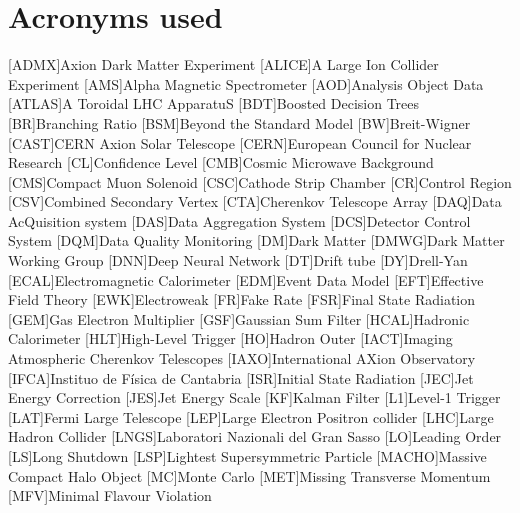 \documentclass[a4paper, 10pt, openright]{report}
\begin{document}
\chapter*{Acronyms used}
\begin{multicols}{2}
\begin{acronym}

[ADMX]{Axion Dark Matter Experiment}
[ALICE]{A Large Ion Collider Experiment}
[AMS]{Alpha Magnetic Spectrometer}
[AOD]{Analysis Object Data}
[ATLAS]{A Toroidal LHC ApparatuS}
[BDT]{Boosted Decision Trees}
[BR]{Branching Ratio}
[BSM]{Beyond the Standard Model}
[BW]{Breit-Wigner}
[CAST]{CERN Axion Solar Telescope}
[CERN]{European Council for Nuclear Research}
[CL]{Confidence Level}
[CMB]{Cosmic Microwave Background}
[CMS]{Compact Muon Solenoid}
[CSC]{Cathode Strip Chamber}
[CR]{Control Region}
[CSV]{Combined Secondary Vertex}
[CTA]{Cherenkov Telescope Array}
[DAQ]{Data AcQuisition system}
[DAS]{Data Aggregation System}
[DCS]{Detector Control System}
[DQM]{Data Quality Monitoring}
[DM]{Dark Matter}
[DMWG]{Dark Matter Working Group}
[DNN]{Deep Neural Network}
[DT]{Drift tube}
[DY]{Drell-Yan}
[ECAL]{Electromagnetic Calorimeter}
[EDM]{Event Data Model}
[EFT]{Effective Field Theory}
[EWK]{Electroweak}
[FR]{Fake Rate}
[FSR]{Final State Radiation}
[GEM]{Gas Electron Multiplier}
[GSF]{Gaussian Sum Filter}
[HCAL]{Hadronic Calorimeter}
[HLT]{High-Level Trigger}
[HO]{Hadron Outer}
[IACT]{Imaging Atmospheric Cherenkov Telescopes}
[IAXO]{International AXion Observatory}
[IFCA]{Instituo de F\'{i}sica de Cantabria}
[ISR]{Initial State Radiation}
[JEC]{Jet Energy Correction}
[JES]{Jet Energy Scale}
[KF]{Kalman Filter}
[L1]{Level-1 Trigger}
[LAT]{Fermi Large Telescope}
[LEP]{Large Electron Positron collider}
[LHC]{Large Hadron Collider}
[LNGS]{Laboratori Nazionali del Gran Sasso}
[LO]{Leading Order}
[LS]{Long Shutdown}
[LSP]{Lightest Supersymmetric Particle}
[MACHO]{Massive Compact Halo Object}
[MC]{Monte Carlo}
[MET]{Missing Transverse Momentum}
[MFV]{Minimal Flavour Violation}

\end{acronym}
\end{multicols}
\end{document}
